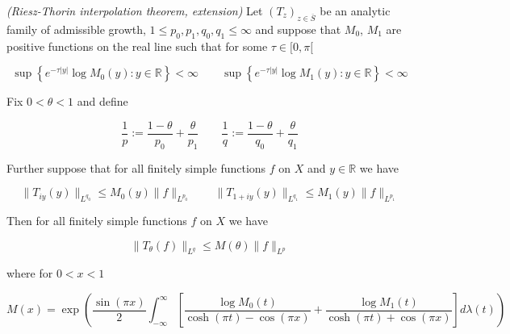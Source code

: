 \begin{mdframed}
	\begin{theorem}\emph{(Riesz-Thorin interpolation theorem, extension)}
		Let $\left( T_z \right)_{z \in \overline{S}}$ be an analytic family of admissible growth, $1 \leqslant p_0,p_1,q_0,q_1 \leqslant \infty$ and suppose that $M_0$, $M_1$ are positive functions on the real line such that for some $\tau \in [0,\pi[$

			\begin{equation}
				\sup\left\{e^{-\tau \vert y \vert} \log M_0(y) : y \in \mathbb{R}\right\} < \infty \qquad \sup\left\{e^{-\tau \vert y \vert} \log M_1(y) : y \in \mathbb{R}\right\} < \infty
			\end{equation}

			Fix $0 < \theta < 1$ and define

			\begin{equation}
				\frac{1}{p} := \frac{1 - \theta}{p_0} + \frac{\theta}{p_1} \qquad \frac{1}{q} := \frac{1 - \theta}{q_0} + \frac{\theta}{q_1}
			\end{equation}

			Further suppose that for all finitely simple functions $f$ on $X$ and $y \in \mathbb{R}$ we have

			\begin{equation}
				\|T_{iy}(y)\|_{L^{q_0}} \leqslant M_0(y)\|f\|_{L^{p_0}} \qquad \|T_{1 + iy}(y)\|_{L^{q_1}} \leqslant M_1(y)\|f\|_{L^{p_1}} 
			\end{equation}

			Then for all finitely simple functions $f$ on $X$ we have

			\begin{equation*}
				\|T_\theta(f)\|_{L^q} \leqslant M(\theta)\|f\|_{L^p}
			\end{equation*}

			where for $0 < x < 1$

			\begin{equation*}
				M(x) = \exp\left( \frac{\sin(\pi x)}{2} \int_{-\infty}^\infty \left[ \frac{\log M_0(t)}{\cosh(\pi t) - \cos(\pi x)} + \frac{\log M_1(t)}{\cosh(\pi t) + \cos(\pi x)}\right] d\lambda(t) \right)
			\end{equation*}
	\end{theorem}
\end{mdframed}

